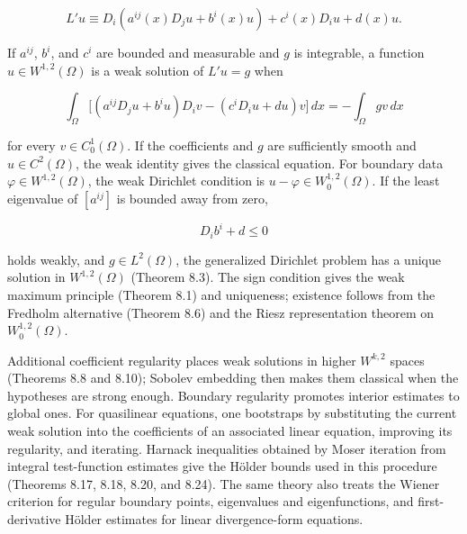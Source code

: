\begin{equation}\label{gt.eq1.6}
L'u \equiv D_i(a^{ij}(x)D_j u + b^i(x)u) + c^i(x)D_i u + d(x)u.
\end{equation}

If $a^{ij}$, $b^i$, and $c^i$ are bounded and measurable and $g$ is integrable,
a function $u\in W^{1,2}(\Omega)$ is a weak solution of $L'u=g$ when

\begin{equation}\label{gt.eq1.7}
\int_{\Omega} \bigl[(a^{ij}D_j u+b^i u)D_i v-(c^i D_i u+d u)v\bigr]\,dx
=-\int_{\Omega} g v\,dx
\end{equation}

for every $v\in C_0^1(\Omega)$. If the coefficients and $g$ are sufficiently
smooth and $u\in C^2(\Omega)$, the weak identity gives the classical equation.
For boundary data $\varphi\in W^{1,2}(\Omega)$, the weak Dirichlet condition is
$u-\varphi\in W_0^{1,2}(\Omega)$. If the least eigenvalue of $[a^{ij}]$ is
bounded away from zero,

\begin{equation}\label{gt.eq1.8}
D_i b^i+d\leq 0
\end{equation}

holds weakly, and $g\in L^2(\Omega)$, the generalized Dirichlet problem has a
unique solution in $W^{1,2}(\Omega)$ (Theorem 8.3). The sign condition gives the
weak maximum principle (Theorem 8.1) and uniqueness; existence follows from the
Fredholm alternative (Theorem 8.6) and the Riesz representation theorem on
$W_0^{1,2}(\Omega)$.

Additional coefficient regularity places weak solutions in higher $W^{k,2}$
spaces (Theorems 8.8 and 8.10); Sobolev embedding then makes them classical when
the hypotheses are strong enough. Boundary regularity promotes interior estimates
to global ones. For quasilinear equations, one bootstraps
by substituting the current weak solution into the coefficients of an associated
linear equation, improving its regularity, and iterating. Harnack inequalities
obtained by Moser iteration from integral test-function estimates give the
H\"older bounds used in this procedure (Theorems 8.17, 8.18, 8.20, and 8.24).
The same theory also treats the Wiener criterion for regular boundary points,
eigenvalues and eigenfunctions, and first-derivative H\"older estimates for linear
divergence-form equations.

